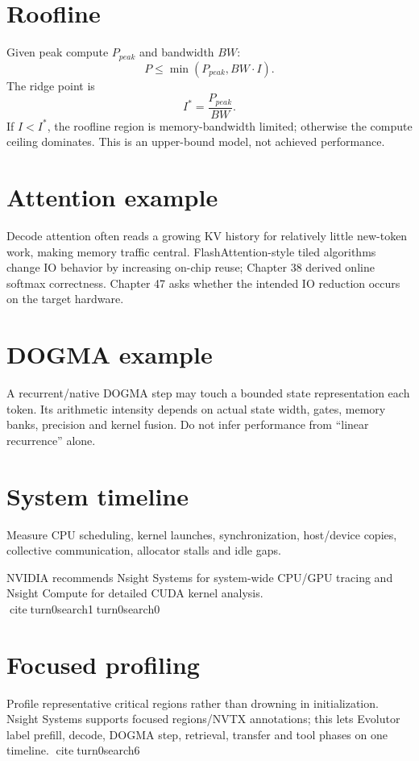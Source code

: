 \section{Roofline}
Given peak compute $P_{peak}$ and bandwidth $BW$:
\[
P\le \min(P_{peak}, BW\cdot I).
\]
The ridge point is
\[
I^*=\frac{P_{peak}}{BW}.
\]
If $I<I^*$, the roofline region is memory-bandwidth limited; otherwise the compute ceiling dominates. This is an upper-bound model, not achieved performance.

\section{Attention example}
Decode attention often reads a growing KV history for relatively little new-token work, making memory traffic central. FlashAttention-style tiled algorithms change IO behavior by increasing on-chip reuse; Chapter 38 derived online softmax correctness. Chapter 47 asks whether the intended IO reduction occurs on the target hardware.

\section{DOGMA example}
A recurrent/native DOGMA step may touch a bounded state representation each token. Its arithmetic intensity depends on actual state width, gates, memory banks, precision and kernel fusion. Do not infer performance from ``linear recurrence'' alone.

\section{System timeline}
Measure CPU scheduling, kernel launches, synchronization, host/device copies, collective communication, allocator stalls and idle gaps.

NVIDIA recommends Nsight Systems for system-wide CPU/GPU tracing and Nsight Compute for detailed CUDA kernel analysis. citeturn0search1turn0search0

\section{Focused profiling}
Profile representative critical regions rather than drowning in initialization. Nsight Systems supports focused regions/NVTX annotations; this lets Evolutor label prefill, decode, DOGMA step, retrieval, transfer and tool phases on one timeline. citeturn0search6

